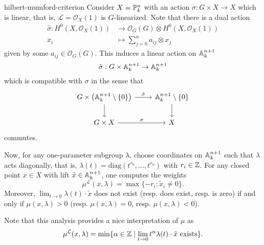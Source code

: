 \begin{example}{hilbert-mumford-criterion}
    Consider $X = \PP^n_k$ with an action $\sigma : G \times X \to X$ which is linear, that is, $\mathcal{L} = \mathcal{O}_X(1)$ is $G$-linearized. Note that there is a dual action
    \[ \begin{aligned}
        \hat{\sigma} : H^0(X, \mathcal{O}_X(1)) &\to \mathcal{O}_G(G) \otimes H^0(X, \mathcal{O}_X(1)) \\
        x_i &\mapsto \sum_{j = 0}^{n} a_{ij} \otimes x_j
    \end{aligned} \]
    given by some $a_{ij} \in \mathcal{O}_G(G)$. This induces a linear action on $\AA^{n + 1}_k$
    \[ \tilde{\sigma} : G \times \AA^{n + 1}_k \to \AA^{n + 1}_k \]
    which is compatible with $\sigma$ in the sense that
    \[ \begin{tikzcd}
        G \times \left(\AA^{n + 1}_k \setminus \{ 0 \} \right) \arrow{d} \arrow{r}{\tilde{\sigma}} & \AA^{n + 1}_k \setminus \{ 0 \} \arrow{d} \\
        G \times X \arrow{r}{\sigma} & X
    \end{tikzcd} \]
    commutes.
    
    Now, for any one-parameter subgroup $\lambda$, choose coordinates on $\AA^{n + 1}_k$ such that $\lambda$ acts diagonally, that is, $\lambda(t) = \text{diag}(t^{r_0}, \ldots, t^{r_n})$ with $r_i \in \ZZ$. For any closed point $x \in X$ with lift $\tilde{x} \in \AA^{n + 1}_k$, one computes the weights
    \[ \mu^{\mathcal{L}}(x, \lambda) = \max \{ -r_i : \tilde{x}_i \ne 0 \} . \]
    Moreover, $\lim_{t \to 0} \lambda(t) \cdot \tilde{x}$ does not exist (resp. does exist, resp. is zero) if and only if $\mu(x, \lambda) > 0$ (resp. $\mu(x, \lambda) = 0$, resp. $\mu(x, \lambda) < 0$). 
    
    Note that this analysis provides a nice interpretation of $\mu$ as
    \[ \mu^{\mathcal{L}}(x, \lambda) = \min \{ \alpha \in \ZZ \mid \lim_{t \to 0} t^\alpha \lambda(t) \cdot \tilde{x} \text{ exists} \} . \]    
\end{example}
